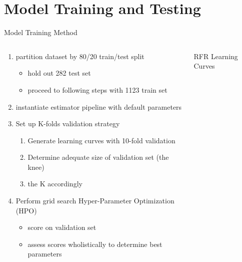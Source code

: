 \documentclass[10pt, aspectratio=169, presentation]{beamer}
\begin{document}
\section{Model Training and Testing}
\label{sec:org8e1df55}
\begin{frame}[label={sec:org2f549a8}]{Model Training Method}
\begin{columns}
\begin{column}{0.5\columnwidth}
\begin{enumerate}
\item partition dataset by 80/20 train/test split
\begin{itemize}
\item hold out 282 test set
\item proceed to following steps with 1123 train set
\end{itemize}
\item instantiate estimator pipeline with default parameters
\item Set up K-folds validation strategy
\begin{enumerate}
\item Generate learning curves with 10-fold validation
\item Determine adequate size of validation set (the knee)
\item the K accordingly
\end{enumerate}
\item Perform grid search Hyper-Parameter Optimization (HPO)
\begin{itemize}
\item score on validation set
\item assess scores wholistically to determine best parameters
\end{itemize}
\end{enumerate}
\end{column}

\begin{column}{0.5\columnwidth}
\begin{block}{RFR Learning Curves}
\begin{center}

\end{center}
\end{block}
\end{column}
\end{columns}
\end{frame}
\end{document}
